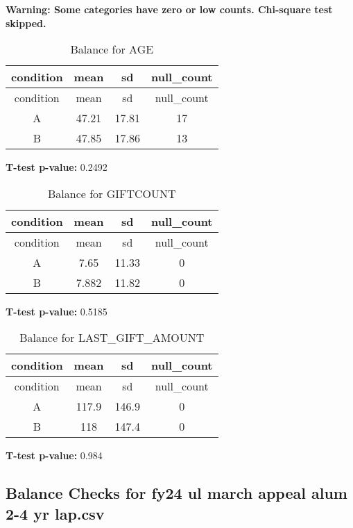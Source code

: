 \documentclass[
]{article}
\begin{document}
\textbf{Warning: Some categories have zero or low counts. Chi-square
test skipped.} \pagebreak

\begin{longtable}[]{@{}cccc@{}}
\caption{Balance for AGE}\tabularnewline
\toprule\noalign{}
condition & mean & sd & null\_count \\
\midrule\noalign{}
\endfirsthead
\toprule\noalign{}
condition & mean & sd & null\_count \\
\midrule\noalign{}
\endhead
\bottomrule\noalign{}
\endlastfoot
A & 47.21 & 17.81 & 17 \\
B & 47.85 & 17.86 & 13 \\
\end{longtable}

\textbf{T-test p-value:} 0.2492\\
\pagebreak

\begin{longtable}[]{@{}cccc@{}}
\caption{Balance for GIFTCOUNT}\tabularnewline
\toprule\noalign{}
condition & mean & sd & null\_count \\
\midrule\noalign{}
\endfirsthead
\toprule\noalign{}
condition & mean & sd & null\_count \\
\midrule\noalign{}
\endhead
\bottomrule\noalign{}
\endlastfoot
A & 7.65 & 11.33 & 0 \\
B & 7.882 & 11.82 & 0 \\
\end{longtable}

\textbf{T-test p-value:} 0.5185\\
\pagebreak

\begin{longtable}[]{@{}cccc@{}}
\caption{Balance for LAST\_GIFT\_AMOUNT}\tabularnewline
\toprule\noalign{}
condition & mean & sd & null\_count \\
\midrule\noalign{}
\endfirsthead
\toprule\noalign{}
condition & mean & sd & null\_count \\
\midrule\noalign{}
\endhead
\bottomrule\noalign{}
\endlastfoot
A & 117.9 & 146.9 & 0 \\
B & 118 & 147.4 & 0 \\
\end{longtable}

\textbf{T-test p-value:} 0.984\\
\pagebreak \clearpage

\subsection{Balance Checks for fy24 ul march appeal alum 2-4 yr
lap.csv}\label{balance-checks-for-fy24-ul-march-appeal-alum-2-4-yr-lap.csv}
\end{document}

